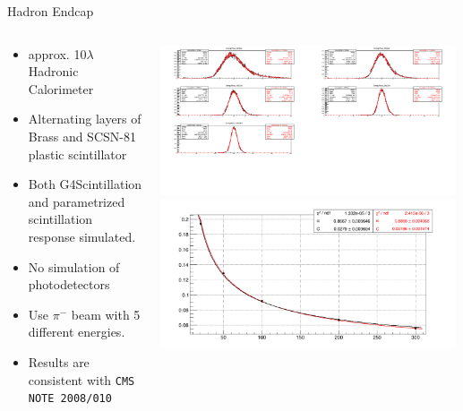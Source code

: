 \documentclass[pdf, 9pt]{beamer}
\begin{document}
  \begin{frame}{Hadron Endcap}
    \begin{columns}[T]
      \begin{column}{0.6\textwidth}
        \begin{itemize}
          \item approx. 10$\lambda$ Hadronic Calorimeter
          \item Alternating layers of Brass and SCSN-81 plastic scintillator
          \item Both G4Scintillation and \alert{parametrized scintillation response} simulated.
          \item No simulation of photodetectors
          \item Use $\pi^{-}$ beam with 5 different energies.
          \item Results are consistent with \texttt{\alert{CMS NOTE 2008/010}}
        \end{itemize}
      \end{column}
      \begin{column}{0.4\textwidth}
        \includegraphics[width=0.99\textwidth, height=0.4\textheight]{figs/he_smallscale/EnergyRECODistributions.png}\\
        \includegraphics[width=0.99\textwidth, height=0.4\textheight]{figs/he_smallscale/Resolution.png}
      \end{column}
    \end{columns}
  \end{frame}
\end{document}
